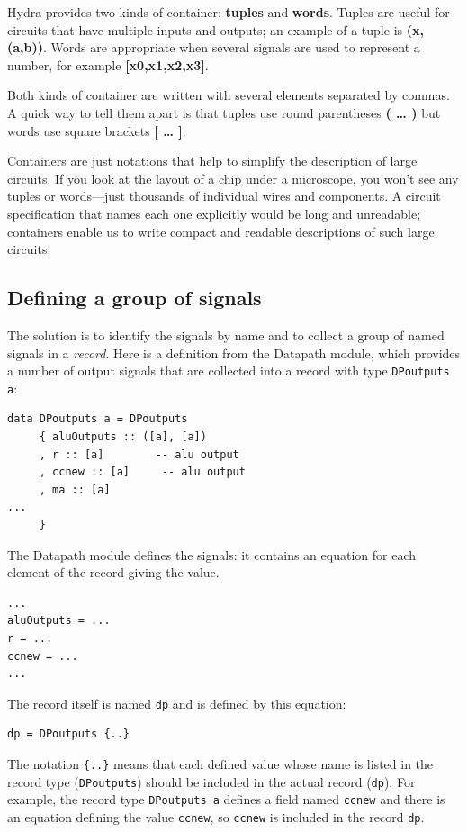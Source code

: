 \documentclass[]{svmono}
\begin{document}
Hydra provides two kinds of container: \textbf{tuples} and \textbf{words}.
Tuples are useful for circuits that have multiple inputs and outputs;
an example of a tuple is \textbf{(x, (a,b))}.  Words are appropriate when
several signals are used to represent a number, for example
\textbf{{[}x0,x1,x2,x3]}.

Both kinds of container are written with several elements separated by
commas.  A quick way to tell them apart is that tuples use round
parentheses \textbf{( \ldots{}  )} but words use square brackets \textbf{{[} \ldots{}  ]}.

Containers are just notations that help to simplify the description of
large circuits.  If you look at the layout of a chip under a
microscope, you won't see any tuples or words---just thousands of
individual wires and components.  A circuit specification that names
each one explicitly would be long and unreadable; containers enable us
to write compact and readable descriptions of such large circuits.
\subsection*{Defining a group of signals}
\label{sec:orga9f7761}

The solution is to identify the signals by name and to collect a
group of named signals in a \emph{record}.  Here is a definition from the
Datapath module, which provides a number of output signals that are
collected into a record with type \texttt{DPoutputs a}:

\begin{verbatim}
data DPoutputs a = DPoutputs
     { aluOutputs :: ([a], [a])
     , r :: [a]        -- alu output
     , ccnew :: [a]     -- alu output
     , ma :: [a]
...
     }
\end{verbatim}

The Datapath module defines the signals: it contains an equation for
each element of the record giving the value.

\begin{verbatim}
...
aluOutputs = ...
r = ...
ccnew = ...
...
\end{verbatim}



The record itself is named \texttt{dp} and is defined by this equation:

\begin{verbatim}
dp = DPoutputs {..}
\end{verbatim}

The notation \texttt{\{..\}} means that each defined value whose name is
listed in the record type (\texttt{DPoutputs}) should be included in the
actual record (\texttt{dp}).  For example, the record type \texttt{DPoutputs a}
defines a field named \texttt{ccnew} and there is an equation defining the
value \texttt{ccnew}, so \texttt{ccnew} is included in the record \texttt{dp}.
\end{document}
